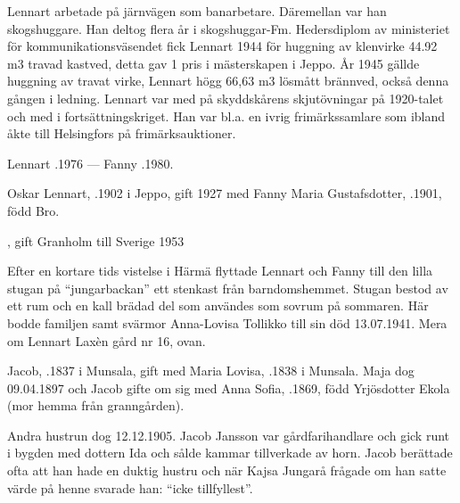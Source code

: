 Lennart arbetade på järnvägen som banarbetare. Däremellan var han skogshuggare. Han deltog flera år i skogshuggar-Fm. Hedersdiplom av ministeriet för kommunikationsväsendet fick Lennart 1944 för huggning av klenvirke 44.92 m3 travad  kastved, detta gav 1 pris i mästerskapen i Jeppo. År 1945 gällde huggning av travat virke, Lennart högg 66,63 m3 lösmått brännved, också denna gången i ledning. Lennart var med på skyddskårens skjutövningar på 1920-talet och med i 	fortsättningskriget. Han var bl.a. en ivrig frimärkssamlare som ibland åkte till Helsingfors på frimärksauktioner.

Lennart .1976  ---  Fanny .1980.







Oskar Lennart, .1902 i Jeppo, gift 1927 med Fanny Maria Gustafsdotter, .1901, född Bro.
\begin{jhchildren}
  \item {}, gift Granholm till Sverige 1953
  \item {}
  \item {}
\end{jhchildren}

Efter en kortare tids vistelse i Härmä flyttade Lennart och Fanny till den lilla stugan på ``jungarbackan'' ett stenkast från barndomshemmet. Stugan bestod av ett rum och en kall brädad del som användes som sovrum på sommaren. Här bodde familjen samt svärmor Anna-Lovisa Tollikko till sin död 13.07.1941. Mera om Lennart Laxèn gård nr 16, ovan.


Jacob, .1837 i Munsala, gift med Maria Lovisa, .1838 i Munsala. Maja dog 09.04.1897 och Jacob gifte om sig med Anna Sofia, .1869, född Yrjösdotter Ekola (mor hemma från granngården).
\begin{jhchildren}
  \item {}
  \item {}
  \item {}
\end{jhchildren}
Andra hustrun dog 12.12.1905. Jacob Jansson var gårdfarihandlare och gick runt i bygden med dottern Ida och sålde kammar tillverkade av horn. Jacob berättade ofta att han hade en duktig hustru och när Kajsa Jungarå frågade om han satte värde på henne svarade han: ``icke tillfyllest''.

